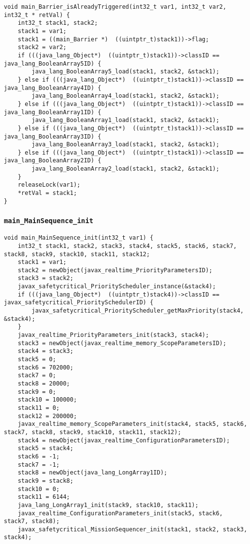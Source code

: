 \begin{landscape}
\begin{multicols}{2}
\begin{lstlisting}[firstnumber=1270]
void main_Barrier_isAlreadyTriggered(int32_t var1, int32_t var2, int32_t * retVal) {
	int32_t stack1, stack2;
	stack1 = var1;
	stack1 = ((main_Barrier *)  ((uintptr_t)stack1))->flag;
	stack2 = var2;
	if (((java_lang_Object*)  ((uintptr_t)stack1))->classID == java_lang_BooleanArray5ID) {
		java_lang_BooleanArray5_load(stack1, stack2, &stack1);
	} else if (((java_lang_Object*)  ((uintptr_t)stack1))->classID == java_lang_BooleanArray4ID) {
		java_lang_BooleanArray4_load(stack1, stack2, &stack1);
	} else if (((java_lang_Object*)  ((uintptr_t)stack1))->classID == java_lang_BooleanArray1ID) {
		java_lang_BooleanArray1_load(stack1, stack2, &stack1);
	} else if (((java_lang_Object*)  ((uintptr_t)stack1))->classID == java_lang_BooleanArray3ID) {
		java_lang_BooleanArray3_load(stack1, stack2, &stack1);
	} else if (((java_lang_Object*)  ((uintptr_t)stack1))->classID == java_lang_BooleanArray2ID) {
		java_lang_BooleanArray2_load(stack1, stack2, &stack1);
	}
	releaseLock(var1);
	*retVal = stack1;
}
\end{lstlisting}

\subsubsection{\texttt{main\_MainSequence\_init}}

\begin{lstlisting}[firstnumber=1297]
void main_MainSequence_init(int32_t var1) {
	int32_t stack1, stack2, stack3, stack4, stack5, stack6, stack7, stack8, stack9, stack10, stack11, stack12;
	stack1 = var1;
	stack2 = newObject(javax_realtime_PriorityParametersID);
	stack3 = stack2;
	javax_safetycritical_PriorityScheduler_instance(&stack4);
	if (((java_lang_Object*)  ((uintptr_t)stack4))->classID == javax_safetycritical_PrioritySchedulerID) {
		javax_safetycritical_PriorityScheduler_getMaxPriority(stack4, &stack4);
	}
	javax_realtime_PriorityParameters_init(stack3, stack4);
	stack3 = newObject(javax_realtime_memory_ScopeParametersID);
	stack4 = stack3;
	stack5 = 0;
	stack6 = 702000;
	stack7 = 0;
	stack8 = 20000;
	stack9 = 0;
	stack10 = 100000;
	stack11 = 0;
	stack12 = 200000;
	javax_realtime_memory_ScopeParameters_init(stack4, stack5, stack6, stack7, stack8, stack9, stack10, stack11, stack12);
	stack4 = newObject(javax_realtime_ConfigurationParametersID);
	stack5 = stack4;
	stack6 = -1;
	stack7 = -1;
	stack8 = newObject(java_lang_LongArray1ID);
	stack9 = stack8;
	stack10 = 0;
	stack11 = 6144;
	java_lang_LongArray1_init(stack9, stack10, stack11);
	javax_realtime_ConfigurationParameters_init(stack5, stack6, stack7, stack8);
	javax_safetycritical_MissionSequencer_init(stack1, stack2, stack3, stack4);


\end{lstlisting}
\end{multicols}
\end{landscape}

